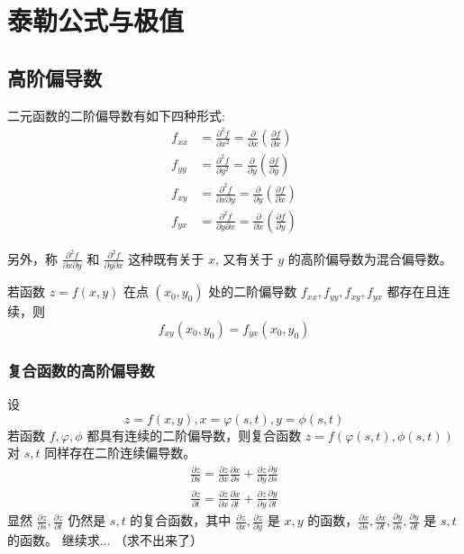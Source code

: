 \section{泰勒公式与极值}

\subsection{高阶偏导数}

二元函数的二阶偏导数有如下四种形式:
\[
    \begin{aligned}
        f_{xx} & =\frac{\partial^2 f}{\partial x^2}=\frac{\partial}{\partial x}\left(\frac{\partial f}{\partial x}\right)         \\
        f_{yy} & =\frac{\partial^2 f}{\partial y^2}=\frac{\partial}{\partial y}\left(\frac{\partial f}{\partial y}\right)         \\
        f_{xy} & =\frac{\partial^2 f}{\partial x\partial y}=\frac{\partial}{\partial y}\left(\frac{\partial f}{\partial x}\right) \\
        f_{yx} & =\frac{\partial^2 f}{\partial y\partial x}=\frac{\partial}{\partial x}\left(\frac{\partial f}{\partial y}\right)
    \end{aligned}
\]

另外，称 $\frac{\partial^2 f}{\partial x\partial y}$ 和 $\frac{\partial^2 f}{\partial y\partial x}$ 这种既有关于 $x$, 又有关于 $y$ 的高阶偏导数为混合偏导数。
\begin{theorem}
    若函数 $z=f(x,y)$ 在点 $(x_0,y_0)$ 处的二阶偏导数 $f_{xx},f_{yy},f_{xy},f_{yx}$ 都存在且连续，则
    \[
        f_{xy}(x_0,y_0)=f_{yx}(x_0,y_0)
    \]
\end{theorem}

\subsubsection{复合函数的高阶偏导数}

设
\[
    z=f(x,y), x=\varphi(s,t), y=\phi(s,t)
\]
若函数 $f,\varphi,\phi$ 都具有连续的二阶偏导数，则复合函数 $z=f(\varphi(s,t),\phi(s,t))$ 对 $s,t$ 同样存在二阶连续偏导数。
\[
    \begin{aligned}
        \frac{\partial z}{\partial s}=\frac{\partial z}{\partial x}\frac{\partial x}{\partial s}+\frac{\partial z}{\partial y}\frac{\partial y}{\partial s} \\
        \frac{\partial z}{\partial t}= \frac{\partial z}{\partial x}\frac{\partial x}{\partial t}+\frac{\partial z}{\partial y}\frac{\partial y}{\partial t}
    \end{aligned}
\]
显然 $\frac{\partial z}{\partial s},\frac{\partial z}{\partial t}$ 仍然是 $s,t$ 的复合函数，其中 $\frac{\partial z}{\partial x},\frac{\partial z}{\partial y}$ 是 $x,y$ 的函数，$\frac{\partial x}{\partial s},\frac{\partial x}{\partial t}, \frac{\partial y}{\partial s}, \frac{\partial y}{\partial t}$ 是 $s,t$ 的函数。
继续求... （求不出来了）